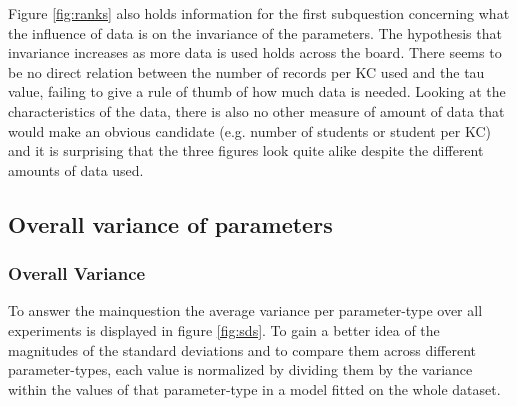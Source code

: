 \documentclass{scrartcl}
\begin{document}
Figure \ref{fig:ranks} also holds information for the first subquestion concerning what the influence of data is on the invariance of the parameters. The hypothesis that invariance increases as more data is used holds across the board. There seems to be no direct relation between the number of records per KC used and the tau value, failing to give a rule of thumb of how much data is needed. Looking at the characteristics of the data, there is also no other measure of amount of data that would make an obvious candidate (e.g. number of students or student per KC) and it is surprising that the three figures look quite alike despite the different amounts of data used.

\subsection{Overall variance of parameters}
\label{sec:varresults}
\subsubsection{Overall Variance}
To answer the mainquestion the average variance per parameter-type over all experiments is displayed in figure \ref{fig:sds}. To gain a better idea of the magnitudes of the standard deviations and to compare them across different parameter-types, each value is normalized by dividing them by the variance within the values of that parameter-type in a model fitted on the whole dataset.
\end{document}
